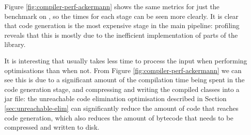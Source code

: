 \documentclass[dissertation.tex]{subfiles}
\begin{document}
{{        Figure \ref{fig:compiler-perf-ackermann} shows the same metrics for just the  benchmark on \compilername, so the times for each stage can be seen more clearly. It is clear that code generation is the most expensive stage in the main pipeline: profiling reveals that this is mostly due to the inefficient implementation of parts of the  library. 
        
        It is interesting that \compilername usually takes less time to process the input when performing optimisations than when not. From Figure \ref{fig:compiler-perf-ackermann} we can see this is due to a significant amount of the compilation time being spent in the code generation stage, and compressing and writing the compiled classes into a jar file: the unreachable code elimination optimisation described in Section \ref{sec:unreachable-elim} can significantly reduce the amount of code that reaches code generation, which also reduces the amount of bytecode that needs to be compressed and written to disk.

}}
\end{document}
